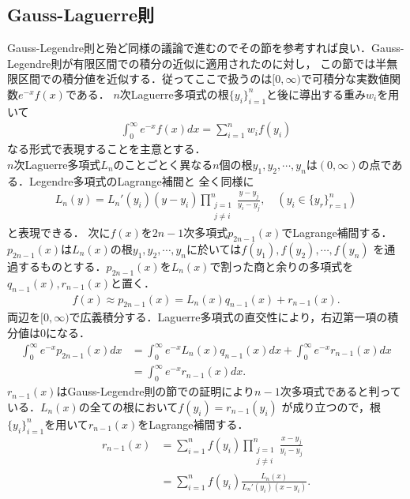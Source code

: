 \documentclass[a4j,papersize,disablejfam,slide,14pt]{jsarticle}
\def\exp#1{e^{#1}} %
\begin{document}
\subsection{{\rm Gauss-Laguerre}則}
	{\rm Gauss-Legendre}則と殆ど同様の議論で進むのでその節を参考すれば良い．{\rm Gauss-Legendre}則が有限区間での積分の近似に適用されたのに対し，
    この節では半無限区間での積分値を近似する．従ってここで扱うのは$[0, \infty)$で可積分な実数値関数$\exp{-x} f(x)$である．
    $n$次{\rm Laguerre}多項式の根$\{y_i\}_{i=1}^{n}$と後に導出する重み$w_i$を用いて
    \begin{align}
    	\int_{0}^{\infty} \exp{-x}f(x) dx = \sum_{i=1}^{n} w_i f(y_i)
    \end{align}
    なる形式で表現することを主意とする．\\
    $n$次{\rm Laguerre}多項式$L_n$のことごとく異なる$n$個の根$y_1, y_2, \cdots, y_n$は$(0, \infty)$の点である．{\rm Legendre}多項式の{\rm Lagrange}補間と
    全く同様に
    \begin{align}
    	L_n(y) = L_n'(y_i)(y - y_i)\prod_{\substack{j=1 \\ j \neq i}}^{n} \frac{y-y_j}{y_i-y_j}, \quad (y_i \in \{y_r\}_{r=1}^{n})
    \end{align}
    と表現できる．
    次に$f(x)$を$2n-1$次多項式$p_{2n-1}(x)$で{\rm Lagrange}補間する．$p_{2n-1}(x)$は$L_n(x)$の根$y_1, y_2, \cdots, y_n$に於いては$f(y_1), f(y_2), \cdots, f(y_n)$
    を通過するものとする．$p_{2n-1}(x)$を$L_n(x)$で割った商と余りの多項式を$q_{n-1}(x), r_{n-1}(x)$と置く．
    \begin{align}
    	f(x) \approx p_{2n-1}(x) = L_n(x)q_{n-1}(x) + r_{n-1}(x).
    \end{align}
    両辺を$[0, \infty)$で広義積分する．{\rm Laguerre}多項式の直交性により，右辺第一項の積分値は$0$になる．
    \begin{align}
    	\int_{0}^{\infty} \exp{-x}p_{2n-1}(x) dx &= \int_{0}^{\infty} \exp{-x}L_n(x)q_{n-1}(x) dx + \int_{0}^{\infty} \exp{-x}r_{n-1}(x) dx \\
        &= \int_{0}^{\infty} \exp{-x}r_{n-1}(x) dx.
    \end{align}
    $r_{n-1}(x)$は{\rm Gauss-Legendre}則の節での証明により$n-1$次多項式であると判っている．$L_n(x)$の全ての根において$f(y_i)=r_{n-1}(y_i)$
    が成り立つので，根$\{y_i\}_{i=1}^{n}$を用いて$r_{n-1}(x)$を{\rm Lagrange}補間する．
    \begin{align}
    	r_{n-1}(x) &= \sum_{i=1}^{n} f(y_i) \prod_{\substack{j=1 \\ j \neq i}}^{n} \frac{x-y_j}{y_i-y_j} \\
        &= \sum_{i=1}^{n} f(y_i) \frac{L_n(x)}{L_n'(y_i)(x-y_i)}.
    \end{align}
\end{document}
